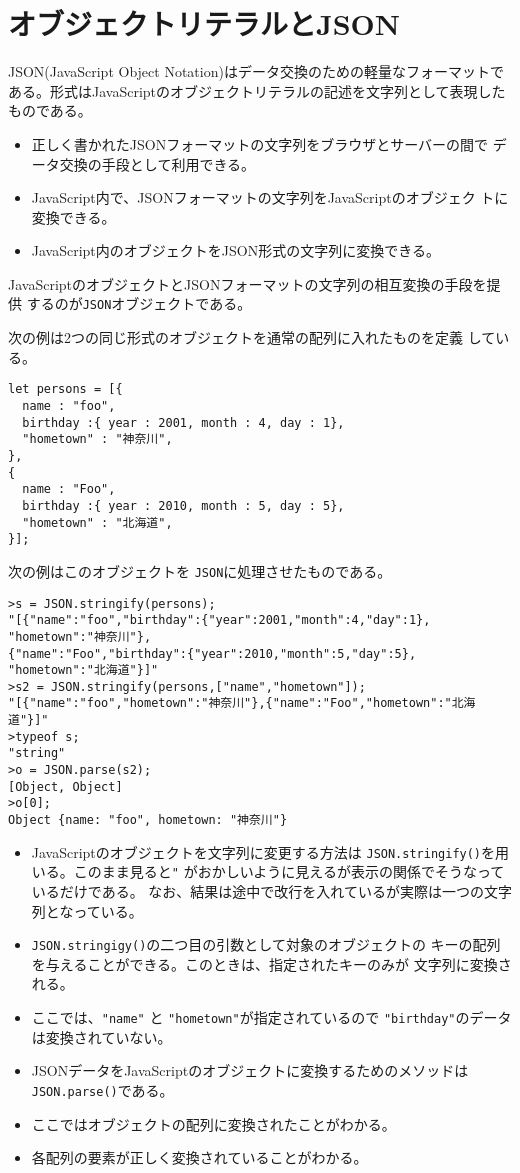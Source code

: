 \section{オブジェクトリテラルとJSON}
JSON(JavaScript Object Notation)はデータ交換のための軽量なフォーマットで
ある。形式はJavaScriptのオブジェクトリテラルの記述を文字列として表現した
ものである。
\begin{itemize}
 \item 正しく書かれたJSONフォーマットの文字列をブラウザとサーバーの間で
       データ交換の手段として利用できる。
 \item JavaScript内で、JSONフォーマットの文字列をJavaScriptのオブジェク
       トに変換できる。
 \item JavaScript内のオブジェクトをJSON形式の文字列に変換できる。
\end{itemize}

JavaScriptのオブジェクトとJSONフォーマットの文字列の相互変換の手段を提供
するのが\texttt{JSON}オブジェクトである。

\begin{Exec}\label{JSONExec}\upshape
次の例は2つの同じ形式のオブジェクトを通常の配列に入れたものを定義
 している。
\begin{Verbatim}
let persons = [{
  name : "foo",
  birthday :{ year : 2001, month : 4, day : 1},
  "hometown" : "神奈川",
},
{
  name : "Foo",
  birthday :{ year : 2010, month : 5, day : 5},
  "hometown" : "北海道",
}];
\end{Verbatim}
次の例はこのオブジェクトを \texttt{JSON}に処理させたものである。
\begin{Verbatim}
>s = JSON.stringify(persons);
"[{"name":"foo","birthday":{"year":2001,"month":4,"day":1},
"hometown":"神奈川"},
{"name":"Foo","birthday":{"year":2010,"month":5,"day":5},
"hometown":"北海道"}]"
>s2 = JSON.stringify(persons,["name","hometown"]);
"[{"name":"foo","hometown":"神奈川"},{"name":"Foo","hometown":"北海道"}]"
>typeof s;
"string"
>o = JSON.parse(s2);
[Object, Object]
>o[0];
Object {name: "foo", hometown: "神奈川"}
\end{Verbatim}
\begin{itemize}
 \item JavaScriptのオブジェクトを文字列に変更する方法は
       \texttt{JSON.stringify()}を用いる。このまま見ると\verb+"+%
			 がおかしいように見えるが表示の関係でそうなっているだけである。
なお、結果は途中で改行を入れているが実際は一つの文字列となっている。
 \item \texttt{JSON.stringigy()}の二つ目の引数として対象のオブジェクトの
       キーの配列を与えることができる。このときは、指定されたキーのみが
       文字列に変換される。
 \item ここでは、\verb+"name"+ と \verb+"hometown"+が指定されているので
\verb+"birthday"+のデータは変換されていない。
 \item JSONデータをJavaScriptのオブジェクトに変換するためのメソッドは
       \texttt{JSON.parse()}である。
 \item ここではオブジェクトの配列に変換されたことがわかる。
 \item 各配列の要素が正しく変換されていることがわかる。
\end{itemize}
\end{Exec}

